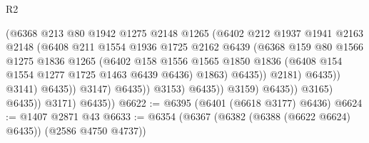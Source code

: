 \begin{lexlean}{R2}
\begin{coremodule}
                                          (@6368
                                            @213
                                            @80
                                            @1942
                                            @1275
                                            @2148
                                            @1265
                                            (@6402
                                              @212
                                              @1937
                                              @1941
                                              @2163
                                              @2148
                                              (@6408
                                                @211
                                                @1554
                                                @1936
                                                @1725
                                                @2162
                                                @6439
                                                (@6368
                                                  @159
                                                  @80
                                                  @1566
                                                  @1275
                                                  @1836
                                                  @1265
                                                  (@6402
                                                    @158
                                                    @1556
                                                    @1565
                                                    @1850
                                                    @1836
                                                    (@6408 @154 @1554 @1277 @1725 @1463 @6439 @6436)
                                                    @1863)
                                                  @6435))
                                              @2181)
                                            @6435))
                                        @3141)
                                      @6435))
                                  @3147)
                                @6435))
                            @3153)
                          @6435))
                      @3159)
                    @6435))
                @3165)
              @6435))
          @3171)
        @6435))
@6622 := @6395 (@6401 (@6618 @3177) @6436)
@6624 := @1407 @2871 @43
@6633 := @6354 (@6367 (@6382 (@6388 (@6622 @6624) @6435)) (@2586 @4750 @4737))

\end{coremodule}
\end{lexlean}
